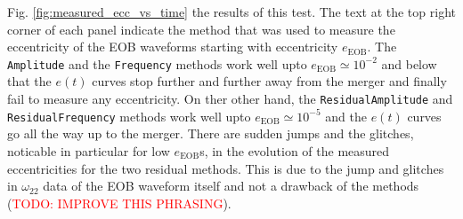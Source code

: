 \documentclass[aps,prd,amsmath,floats,floatfix, twocolumn,
superscriptaddress,nofootinbib,showpacs]{revtex4-1}
\newcommand{\red}{\textcolor{red}}
\newcommand{\TODO}[1]{\red{TODO: #1}}
\newcommand{\eEOB}{e_{\text{EOB}}}
\newcommand{\mAmp}{\texttt{Amplitude}}
\newcommand{\mFreq}{\texttt{Frequency}}
\newcommand{\mResAmp}{\texttt{ResidualAmplitude}}
\newcommand{\mResFreq}{\texttt{ResidualFrequency}}
\begin{document}
Fig. \ref{fig:measured_ecc_vs_time} the results of this test. The text
at the top right corner of each panel indicate the method that was
used to measure the eccentricity of the EOB waveforms starting with
eccentricity $\eEOB$. The \mAmp{} and the
\mFreq{} methods work well upto $\eEOB \simeq
10^{-2}$ and below that the $e(t)$ curves stop further and further
away from the merger and finally fail to measure any eccentricity. On
ther other hand, the \mResAmp{} and
\mResFreq{} methods work well upto $\eEOB
\simeq 10^{-5}$ and the $e(t)$ curves go all the way up to the
merger. There are sudden jumps and the glitches, noticable in
particular for low $\eEOB$s, in the evolution of the measured
eccentricities for the two residual methods.  This is due to the jump
and glitches in $\omega_{22}$ data of the EOB waveform itself and not
a drawback of the methods (\TODO{IMPROVE THIS PHRASING}).
\end{document}
